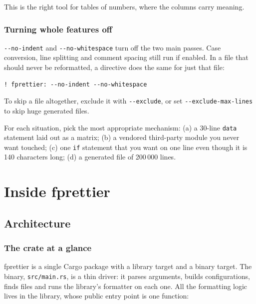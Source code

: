 \documentclass[11pt,a4paper,openany]{book}
\newcommand{\code}[1]{\texttt{\small #1}}
\newcommand{\file}[1]{\texttt{\small\color{accent}#1}}
\newcommand{\flag}[1]{\texttt{\small -{}-#1}}
\newcounter{exercise}[chapter]
\begin{document}
This is the right tool for tables of numbers, where the columns carry meaning.

\section{Turning whole features off}

\flag{no-indent} and \flag{no-whitespace} turn off the two main passes.
Case conversion, line splitting and comment spacing still run if enabled. In a
file that should never be reformatted, a directive does the same for just that
file:

\begin{lstlisting}[style=fortran]
! fprettier: --no-indent --no-whitespace
\end{lstlisting}

To skip a file altogether, exclude it with \flag{exclude}, or set
\flag{exclude-max-lines} to skip huge generated files.

\begin{exercise}
For each situation, pick the most appropriate mechanism: (a) a 30-line
\code{data} statement laid out as a matrix; (b) a vendored third-party module
you never want touched; (c) one \code{if} statement that you want on one line
even though it is 140 characters long; (d) a generated file of 200\,000 lines.
\end{exercise}
\part{Inside fprettier}

\chapter{Architecture}\label{ch:arch}

\section{The crate at a glance}

fprettier is a single Cargo package with a library target and a binary target.
The binary, \file{src/main.rs}, is a thin driver: it parses arguments, builds
configurations, finds files and runs the library's formatter on each one. All
the formatting logic lives in the library, whose public entry point is one
function:
\end{document}
